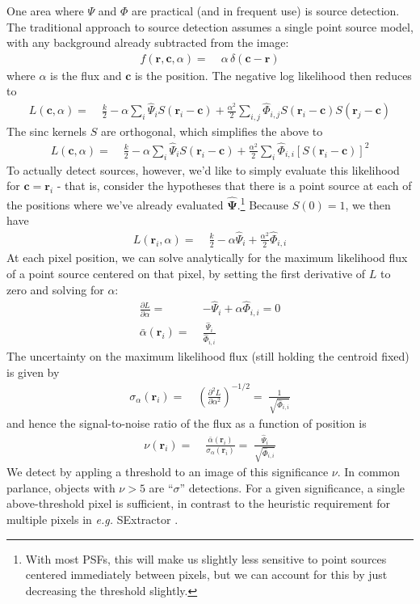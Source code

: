 \documentclass[10pt]{article}
\begin{document}
One area where $\Psi$ and $\Phi$ are practical (and in frequent use) is source detection.  The traditional approach to source detection assumes a single point source model, with any background already subtracted from the image:
\begin{align}
f(\bm{r},\bm{c},\alpha) =\;& \alpha\,\delta(\bm{c}-\bm{r})
\end{align}
where $\alpha$ is the flux and $\bm{c}$ is the position.  The negative log likelihood then reduces to
\begin{align}
L(\bm{c},\alpha) =\;& \frac{k}{2}
        - \alpha \sum_i \hat{\Psi}_i S(\bm{r}_i-\bm{c})
        + \frac{\alpha^2}{2} \sum_{i,j}
            \hat{\Phi}_{i,j} S(\bm{r}_i-\bm{c}) S(\bm{r}_j - \bm{c})
\end{align}
The sinc kernels $S$ are orthogonal, which simplifies the above to
\begin{align}
L(\bm{c},\alpha) =\;& \frac{k}{2}
        - \alpha \sum_i \hat{\Psi}_i S(\bm{r}_i-\bm{c})
        + \frac{\alpha^2}{2} \sum_{i}
            \hat{\Phi}_{i,i} \left[S(\bm{r}_i-\bm{c})\right]^2
\end{align}
To actually detect sources, however, we'd like to simply evaluate this likelihood for $\bm{c} = \bm{r}_i$ - that is, consider the hypotheses that there is a point source at each of the positions where we've already evaluated $\hat{\bm{\Psi}}$.\footnote{With most PSFs, this will make us slightly less sensitive to point sources centered immediately between pixels, but we can account for this by just decreasing the threshold slightly.}  Because $S(0)=1$, we then have
\begin{align}
L(\bm{r}_i,\alpha) =\;& \frac{k}{2} -\alpha \hat{\Psi}_i
    + \frac{\alpha^2}{2} \hat{\Phi}_{i,i}
\end{align}
At each pixel position, we can solve analytically for the maximum likelihood flux of a point source centered on that pixel, by setting the first derivative of $L$ to zero and solving for $\alpha$:
\begin{align}
\frac{\partial L}{\partial \alpha} =\;&
    -\hat{\Psi}_i + \alpha \hat{\Phi}_{i,i} = 0\\
\bar{\alpha}(\bm{r}_i) =\;& \frac{\hat{\Psi}_i}{\hat{\Phi}_{i,i}}
\end{align}
The uncertainty on the maximum likelihood flux (still holding the centroid fixed) is given by
\begin{align}
\sigma_{\alpha}(\bm{r}_i) =\;&
    \left(\frac{\partial^2 L}{\partial \alpha^2}\right)^{-1/2}
    =\; \frac{1}{\sqrt{\hat{\Phi}_{i,i}}}
\end{align}
and hence the signal-to-noise ratio of the flux as a function of position is
\begin{align}
\nu(\bm{r}_i) =\;&
    \frac{\bar{\alpha}(\bm{r}_i)}{\sigma_{\alpha}(\bm{r}_i)} =\;
    \frac{\hat{\Psi}_i}{\sqrt{\hat{\Phi}_{i,i}}}
\end{align}
We detect by appling a threshold to an image of this significance $\nu$.  In common parlance, objects with $\nu>5$ are ``$\sigma$'' detections.  For a given significance, a single above-threshold pixel is sufficient, in contrast to the heuristic requirement for multiple pixels in \textit{e.g.} SExtractor \citep{1996A&AS..117..393B}.
\end{document}
